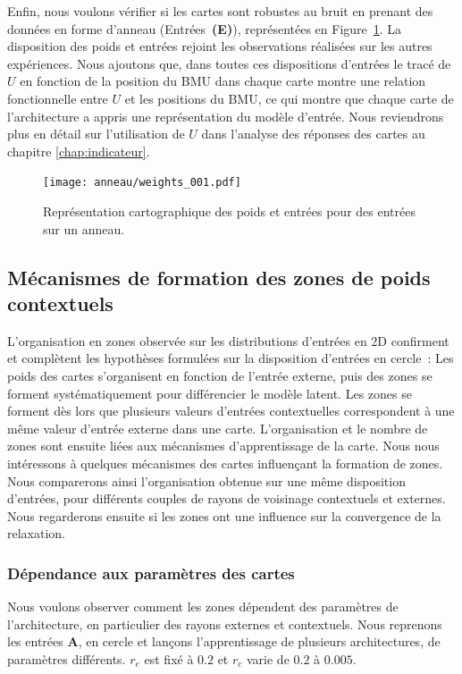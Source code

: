 \documentclass[../main]{subfiles}
\begin{document}
Enfin, nous voulons vérifier si les cartes sont robustes au bruit en prenant des données en forme d'anneau (Entrées~\textbf{(E)}), représentées en Figure~\ref{fig:anneau_w}. La disposition des poids et entrées rejoint les observations réalisées sur les autres expériences.
Nous ajoutons que, dans toutes ces dispositions d'entrées le tracé de $U$ en fonction de la position du BMU dans chaque carte montre une relation fonctionnelle entre $U$ et les positions du BMU, ce qui montre que chaque carte de l'architecture a appris une représentation du modèle d'entrée. Nous reviendrons plus en détail sur l'utilisation de $U$ dans l'analyse des réponses des cartes au chapitre \ref{chap:indicateur}.
\begin{figure}[H]
	\centering\texttt{[image: anneau/weights\_001.pdf]}
	\caption{Représentation cartographique des poids et entrées pour des entrées sur un anneau. \label{fig:anneau_w}}
\end{figure}

\subsection{Mécanismes de formation des zones de poids contextuels}

L'organisation en zones observée sur les distributions d'entrées en 2D confirment et complètent les hypothèses formulées sur la disposition d'entrées en cercle~:
Les poids des cartes s'organisent en fonction de l'entrée externe, puis des zones se forment systématiquement pour différencier le modèle latent. Les zones se forment dès lors que plusieurs valeurs d'entrées contextuelles correspondent à une même valeur d'entrée externe dans une carte.
L'organisation et le nombre de zones sont ensuite liées aux mécanismes d'apprentissage de la carte.
Nous nous intéressons à quelques mécanismes des cartes influençant la formation de zones. 
Nous comparerons ainsi l'organisation obtenue sur une même disposition d'entrées, pour différents couples de rayons de voisinage contextuels et externes. 
Nous regarderons ensuite si les zones ont une influence sur la convergence de la relaxation.

\subsubsection{Dépendance aux paramètres des cartes}

Nous voulons observer comment les zones dépendent des paramètres de l'architecture, en particulier des rayons externes et contextuels.
Nous reprenons les entrées \textbf{A}, en cercle et lançons l'apprentissage de plusieurs architectures, de paramètres différents. $r_e$ est fixé à $0.2$ et $r_c$ varie de $0.2$ à $0.005$. 
\end{document}
